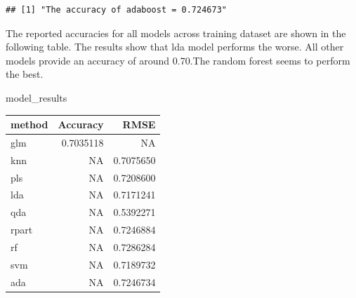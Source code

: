 \documentclass[]{article}
\newenvironment{Shaded}{\begin{snugshade}}{\end{snugshade}}
\newcommand{\CommentTok}[1]{\textcolor[rgb]{0.56,0.35,0.01}{\textit{#1}}}
\newcommand{\DataTypeTok}[1]{\textcolor[rgb]{0.13,0.29,0.53}{#1}}
\newcommand{\DecValTok}[1]{\textcolor[rgb]{0.00,0.00,0.81}{#1}}
\newcommand{\KeywordTok}[1]{\textcolor[rgb]{0.13,0.29,0.53}{\textbf{#1}}}
\newcommand{\NormalTok}[1]{#1}
\newcommand{\OperatorTok}[1]{\textcolor[rgb]{0.81,0.36,0.00}{\textbf{#1}}}
\newcommand{\StringTok}[1]{\textcolor[rgb]{0.31,0.60,0.02}{#1}}
\begin{document}
\begin{Shaded}
\end{Shaded}

\begin{verbatim}
## [1] "The accuracy of adaboost = 0.724673"
\end{verbatim}

\begin{Shaded}
\end{Shaded}

The reported accuracies for all models across training dataset are shown
in the following table. The results show that lda model performs the
worse. All other models provide an accuracy of around 0.70.The random
forest seems to perform the best.

\begin{Shaded}
\begin{Highlighting}[]
\NormalTok{model_results}
\end{Highlighting}
\end{Shaded}

\begin{longtable}[]{@{}lrr@{}}
\toprule
method & Accuracy & RMSE\tabularnewline
\midrule
\endhead
glm & 0.7035118 & NA\tabularnewline
knn & NA & 0.7075650\tabularnewline
pls & NA & 0.7208600\tabularnewline
lda & NA & 0.7171241\tabularnewline
qda & NA & 0.5392271\tabularnewline
rpart & NA & 0.7246884\tabularnewline
rf & NA & 0.7286284\tabularnewline
svm & NA & 0.7189732\tabularnewline
ada & NA & 0.7246734\tabularnewline
\bottomrule
\end{longtable}
\end{document}
